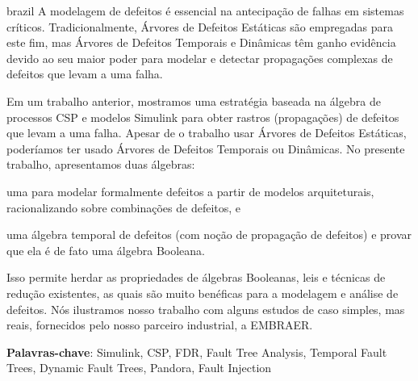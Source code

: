 \documentclass[12pt,openright,twoside,a4paper,oldfontcommands,english,brazil,draft]{abntex2}
\theoremstyle{theo}
\begin{document}

\begin{resumo}[Resumo]
\begin{otherlanguage*}{brazil}
A modelagem de defeitos é essencial na antecipação de falhas em sistemas críticos.
Tradicionalmente, Árvores de Defeitos Estáticas são empregadas para este fim, mas Árvores de Defeitos Temporais e Dinâmicas têm ganho evidência devido ao seu maior poder para modelar e detectar propagações complexas de defeitos que levam a uma falha.

Em um trabalho anterior, mostramos uma estratégia baseada na álgebra de processos CSP e modelos Simulink para obter rastros (propagações) de defeitos que levam a uma falha.
Apesar de o trabalho usar Árvores de Defeitos Estáticas, poderíamos ter usado Árvores de Defeitos Temporais ou Dinâmicas.
No presente trabalho, apresentamos duas álgebras:
\begin{alineasinline}
  \item uma para modelar formalmente defeitos a partir de modelos arquiteturais, racionalizando sobre combinações de defeitos, e
  \item uma álgebra temporal de defeitos (com noção de propagação de defeitos) e provar que ela é de fato uma álgebra Booleana.
\end{alineasinline}
Isso permite herdar as propriedades de álgebras Booleanas, leis e técnicas de redução existentes, as quais são muito benéficas para a modelagem e análise de defeitos.
Nós ilustramos nosso trabalho com alguns estudos de caso simples, mas reais, fornecidos pelo nosso parceiro industrial, a EMBRAER.

\vspace{\onelineskip}
\noindent
\textbf{Palavras-chave}: Simulink, CSP, FDR, Fault Tree Analysis, Temporal Fault Trees, Dynamic Fault Trees, Pandora, Fault Injection
\end{otherlanguage*}
\end{resumo}


\end{document}
